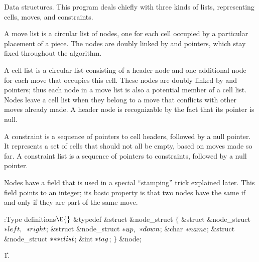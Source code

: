 Data structures. This program deals chiefly with three kinds of lists,
representing cells, moves, and constraints.

A move list is a circular list of nodes, one for each cell occupied by
a particular placement of a piece. The nodes are doubly linked by
 and  pointers, which stay fixed throughout the
algorithm.

A cell list is a circular list consisting of a header node and one additional
node for each move that occupies this cell. These nodes are doubly linked
by  and  pointers; thus each node in a move list is
also a potential
member of a cell list. Nodes leave a cell list when they belong to a move
that conflicts with other moves already made. A header node is recognizable
by the fact that its  pointer is null.

A constraint is a sequence of pointers to cell headers, followed
by a null pointer. It represents a set of cells that should not all be
empty, based on moves made so far. A constraint list is a sequence of pointers
to constraints, followed by a null pointer.

Nodes have a  field that is used in a special ``stamping'' trick
explained later. This field points to an integer; its basic property is
that two nodes have the same  if and only if they are part
of the same move.

\Y\B\4:Type definitions\X${}\E{}$\6
\&{typedef} \&{struct} \&{node\_struct} ${}\{{}$\1\6
\&{struct} \&{node\_struct} ${}{*}\\{left},{}$ ${}{*}\\{right}{}$;\6
\&{struct} \&{node\_struct} ${}{*}\\{up},{}$ ${}{*}\\{down}{}$;\6
\&{char} ${}{*}\\{name}{}$;\6
\&{struct} \&{node\_struct} ${}{*}{*}{*}\\{clist}{}$;\6
\&{int} ${}{*}\\{tag}{}$;\2\6
${}\}{}$ \&{node};\par
\U1.\fi

